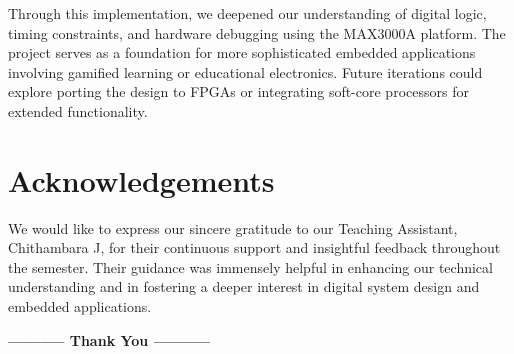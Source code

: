 \documentclass[10pt,a4paper,twocolumn,twoside]{tau-class/tau}
\begin{document}
Through this implementation, we deepened our understanding of digital logic, timing constraints, and hardware debugging using the MAX3000A platform. The project serves as a foundation for more sophisticated embedded applications involving gamified learning or educational electronics. Future iterations could explore porting the design to FPGAs or integrating soft-core processors for extended functionality.

\section{Acknowledgements}

We would like to express our sincere gratitude to our Teaching Assistant, Chithambara J, for their continuous support and insightful feedback throughout the semester. Their guidance was immensely helpful in enhancing our technical understanding and in fostering a deeper interest in digital system design and embedded applications.

\vspace{2em}
\begin{center}
  \large\textbf{-----------  Thank You  -----------}
\end{center}

\end{document}
